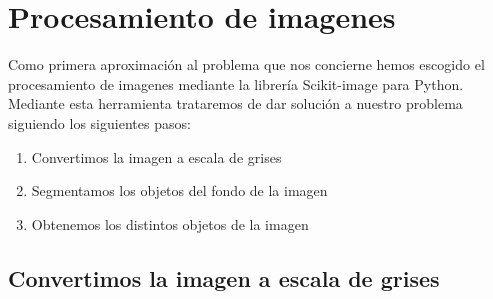 
\begin{comment}
Este apartado pretende recoger los aspectos más interesantes del desarrollo del proyecto, comentados por los autores del mismo.
Debe incluir desde la exposición del ciclo de vida utilizado, hasta los detalles de mayor relevancia de las fases de análisis, diseño e implementación.
Se busca que no sea una mera operación de copiar y pegar diagramas y extractos del código fuente, sino que realmente se justifiquen los caminos de solución que se han tomado, especialmente aquellos que no sean triviales.
Puede ser el lugar más adecuado para documentar los aspectos más interesantes del diseño y de la implementación, con un mayor hincapié en aspectos tales como el tipo de arquitectura elegido, los índices de las tablas de la base de datos, normalización y desnormalización, distribución en ficheros3, reglas de negocio dentro de las bases de datos (EDVHV GH GDWRV DFWLYDV), aspectos de desarrollo relacionados con el WWW...
Este apartado, debe convertirse en el resumen de la experiencia práctica del proyecto, y por sí mismo justifica que la memoria se convierta en un documento útil, fuente de referencia para los autores, los tutores y futuros alumnos.
\end{comment}

\section{Procesamiento de imagenes}

Como primera aproximación al problema que nos concierne hemos escogido el procesamiento de imagenes mediante la librería Scikit-image para Python. Mediante esta herramienta trataremos de dar solución a nuestro problema siguiendo los siguientes pasos:

\begin{enumerate}[1.]
  \item Convertimos la imagen a escala de grises
  \item Segmentamos los objetos del fondo de la imagen
  \item Obtenemos los distintos objetos de la imagen
\end{enumerate}

\subsection{Convertimos la imagen a escala de grises}

